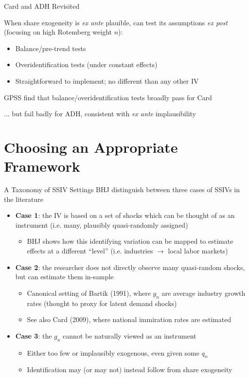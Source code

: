 \documentclass{beamer}
\begin{document}
\begin{frame}{Card and ADH Revisited}

When share exogeneity is \emph{ex ante} plauible, can test its assumptions \emph{ex post} (focusing on high Rotemberg weight $n$):\smallskip
\begin{itemize}
\item Balance/pre-trend tests
\item Overidentification tests (under constant effects)\smallskip
\item Straightforward to implement; no different than any other IV\smallskip
\end{itemize}
\bigskip\pause{}

GPSS find that balance/overidentification tests broadly pass for Card

 ... but fail badly for ADH, consistent with \emph{ex ante} implausibility
\end{frame}

\section{Choosing an Appropriate Framework}

\begin{frame}{A Taxonomy of SSIV Settings}
\vspace{-0.3cm}
BHJ distinguish between three cases of SSIVs in the literature\medskip\pause{}

\begin{itemize}
\item \textbf{Case 1}: the IV is based on a set of shocks which can be thought of as an instrument (i.e. many, plausibly quasi-randomly assigned)\smallskip
\begin{itemize}
\item BHJ shows how this identifying variation can be mapped to estimate effects at a different ``level'' (i.e. industries $\rightarrow$ local labor markets)
\end{itemize}\medskip\pause{}
\item \textbf{Case 2}: the researcher does not directly observe many quasi-random shocks, but can estimate them in-sample\smallskip
\begin{itemize}
\item Canonical setting of Bartik (1991), where $g_n$ are average industry growth rates (thought to proxy for latent demand shocks)\smallskip
\item See also Card (2009), where national immiration rates are estimated
\end{itemize}\medskip\pause{}
\item \textbf{Case 3}: the $g_n$ cannot be naturally viewed as an instrument\smallskip
\begin{itemize}
\item Either too few or implausibly exogenous, even given some $q_n$\smallskip
\item Identification may (or may not) instead follow from share exogeneity
\end{itemize}
\end{itemize}

\end{frame}
\end{document}
